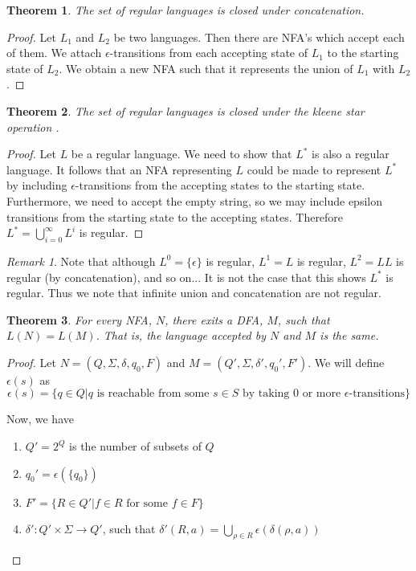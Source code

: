 \documentclass[11pt]{article}
\theoremstyle{plain} %
\newtheorem*{theorem}{Theorem}
\theoremstyle{definition}
\theoremstyle{example}
\theoremstyle{remark}
\newtheorem*{remark}{Remark}
\begin{document}
\begin{theorem}
The set of regular languages is closed under concatenation.
\end{theorem}

\begin{proof}
Let $L_1$ and $L_2$ be two languages. Then there are NFA's which accept each of them. We attach $\epsilon$-transitions from each accepting state of $L_1$ to the starting state of $L_2$. We obtain a new NFA such that it represents the union of $L_1$ with $L_2$. 
\end{proof}

\begin{theorem}
The set of regular languages is closed under the kleene star operation .
\end{theorem}

\begin{proof}
Let $L$ be a regular language. We need to show that $L^*$ is also a regular language. It follows that an NFA representing $L$ could be made to represent $L^*$ by including $\epsilon$-transitions from the accepting states to the starting state. Furthermore, we need to accept the empty string, so we may include epsilon transitions from the starting state to the accepting states. Therefore $L^* = \bigcup \limits_{i=0}^\infty L^i$ is regular.
\end{proof}

\begin{remark}
Note that although $L^0 = \{\epsilon\}$ is regular, $L^1 = L$ is regular, $L^2 = LL$ is regular (by concatenation), and so on... It is not the case that this shows $L^*$ is regular. Thus we note that infinite union and concatenation are not regular.
\end{remark}


\begin{theorem}
For every NFA, $N$, there exits a DFA, $M$, such that $L(N) = L(M)$. That is, the language accepted by $N$ and $M$ is the same.
\end{theorem}


\begin{proof}
Let $N= (Q, \Sigma, \delta, q_0, F)$ and $M = (Q', \Sigma, \delta', q_0', F')$. We will define $\epsilon(s)$ as $$\epsilon(s) = \{ q \in Q | q \text{ is reachable from some }s \in S \text{ by taking 0 or more } \epsilon\text{-transitions}\}$$

Now, we have 

\begin{enumerate}
	\item $Q' = 2^Q$ is the number of subsets of $Q$
	\item $q_0' = \epsilon(\{q_0\})$
	\item $F' = \{R \in Q'|f \in R \text{ for some }f\in F\}$
	\item $\delta':Q'\times \Sigma \rightarrow Q'$, such that $\delta'(R,a) = \bigcup\limits_{\rho \in R} \epsilon(\delta(\rho, a))$

\end{enumerate}
\end{proof}
\end{document}
